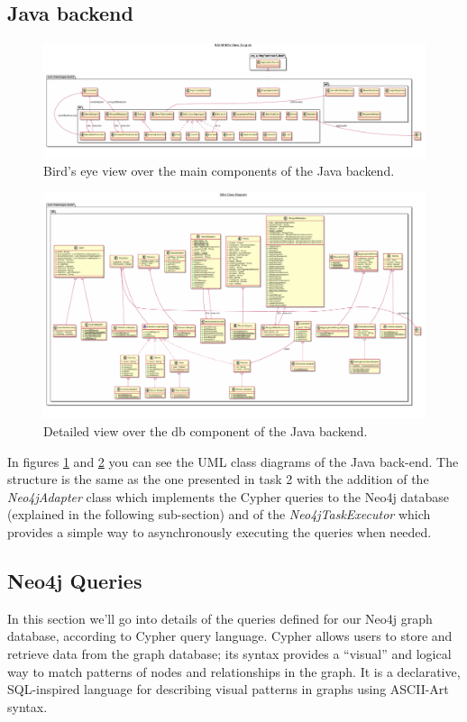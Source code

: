 \documentclass[11pt]{article}
\begin{document}
\subsection{Java backend}
\begin{figure}[]
    \centering
    \includegraphics[width=\textheight,angle=90]{figs/backend.pdf}
    \caption{Bird's eye view over the main components of the Java backend.}
    \label{fig:uml-backend}
\end{figure}
\begin{figure}[]
    \centering
    \includegraphics[width=\textheight,angle=90]{figs/db.pdf}
    \caption{Detailed view over the db component of the Java backend.}
    \label{fig:uml-db}
\end{figure}

In figures \ref{fig:uml-backend} and \ref{fig:uml-db} you can see the UML class
diagrams of the Java back-end. The structure is the same as the one presented 
in task 2 with the addition of the \emph{Neo4jAdapter} class which implements the Cypher queries to the Neo4j database (explained in the following sub-section) and of the \emph{Neo4jTaskExecutor} which provides a simple way to asynchronously executing the queries when needed. 


\subsection{Neo4j Queries}
In this section we'll go into details of the queries defined for our Neo4j graph database, according to Cypher query language. Cypher allows users to store and retrieve data from the graph database; its syntax provides a ``visual'' and logical way to match patterns of nodes and relationships in the graph. It is a declarative, SQL-inspired language for describing visual patterns in graphs using ASCII-Art syntax.
\end{document}
